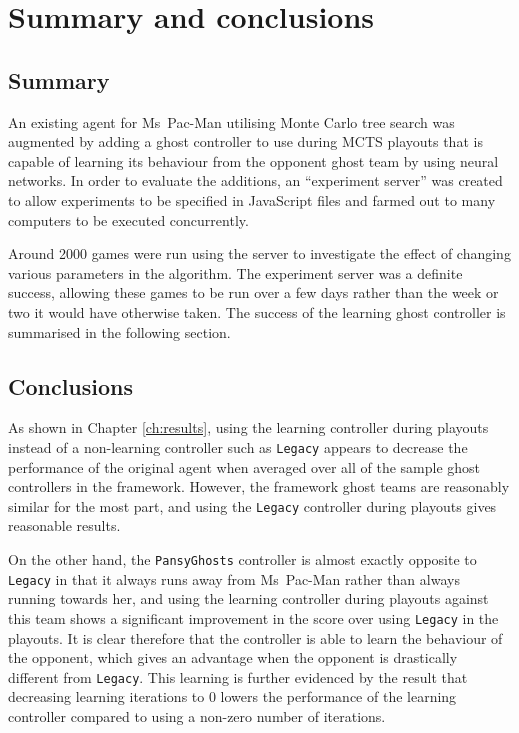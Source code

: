 \chapter{Summary and conclusions}
\label{ch:summary}

\section{Summary}
An existing agent for Ms~Pac-Man utilising Monte Carlo tree search was augmented by adding a ghost controller to use during MCTS playouts that is capable of learning its behaviour from the opponent ghost team by using neural networks.  In order to evaluate the additions, an ``experiment server'' was created to allow experiments to be specified in JavaScript files and farmed out to many computers to be executed concurrently.

Around 2000 games were run using the server to investigate the effect of changing various parameters in the algorithm.  The experiment server was a definite success, allowing these games to be run over a few days rather than the week or two it would have otherwise taken.  The success of the learning ghost controller is summarised in the following section.

\section{Conclusions}

As shown in Chapter \ref{ch:results}, using the learning controller during playouts instead of a non-learning controller such as {\tt Legacy} appears to decrease the performance of the original agent when averaged over all of the sample ghost controllers in the framework.  However, the framework ghost teams are reasonably similar for the most part, and using the {\tt Legacy} controller during playouts gives reasonable results.

On the other hand, the {\tt PansyGhosts} controller is almost exactly opposite to {\tt Legacy} in that it always runs away from Ms~Pac-Man rather than always running towards her, and using the learning controller during playouts against this team shows a significant improvement in the score over using {\tt Legacy} in the playouts.  It is clear therefore that the controller is able to learn the behaviour of the opponent, which gives an advantage when the opponent is drastically different from {\tt Legacy}.  This learning is further evidenced by the result that decreasing learning iterations to 0 lowers the performance of the learning controller compared to using a non-zero number of iterations.


